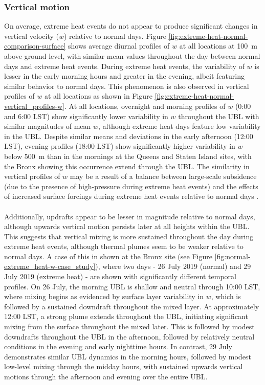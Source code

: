 \documentclass[11pt,a4paper]{article}
\begin{document}
\subsubsection{Vertical motion}
On average, extreme heat events do not appear to produce significant changes in vertical velocity ($w$) relative to normal days. Figure \ref{fig:extreme-heat-normal-comparison-surface} shows average diurnal profiles of $w$ at all locations at \SI{100}{\meter} above ground level, with similar mean values throughout the day between normal days and extreme heat events. During extreme heat events, the variability of $w$ is lesser in the early morning hours and greater in the evening, albeit featuring similar behavior to normal days. This phenomenon is also observed in vertical profiles of $w$ at all locations as shown in Figure \ref{fig:extreme-heat-normal-vertical_profiles-w}. At all locations, overnight and morning profiles of $w$ (0:00 and 6:00 LST) show significantly lower variability in $w$ throughout the UBL with similar magnitudes of mean $w$, although extreme heat days feature low variability in the UBL. Despite similar means and deviations in the early afternoon (12:00 LST), evening profiles (18:00 LST) show significantly higher variability in $w$ below \SI{500}{\meter} than in the mornings at the Queens and Staten Island sites, with the Bronx showing this occurrence extend through the UBL. The similarity in vertical profiles of $w$ may be a result of a balance between large-scale subsidence (due to the presence of high-pressure during extreme heat events) and the effects of increased surface forcings during extreme heat events relative to normal days \citep{dong2018, zhang2009}.
\\ \\
Additionally, updrafts appear to be lesser in magnitude relative to normal days, although upwards vertical motion persists later at all heights within the UBL. This suggests that vertical mixing is more sustained throughout the day during extreme heat events, although thermal plumes seem to be weaker relative to normal days. A case of this in shown at the Bronx site (see Figure \ref{fig:normal-extreme_heat-w-case_study}), where two days - 26 July 2019 (normal) and 29 July 2019 (extreme heat) - are shown with significantly different temporal profiles. On 26 July, the morning UBL is shallow and neutral through 10:00 LST, where mixing begins as evidenced by surface layer variability in $w$, which is followed by a sustained downdraft throughout the mixed layer. At approximately 12:00 LST, a strong plume extends throughout the UBL, initiating significant mixing from the surface throughout the mixed later. This is followed by modest downdrafts throughout the UBL in the afternoon, followed by relatively neutral conditions in the evening and early nighttime hours. In contrast, 29 July demonstrates similar UBL dynamics in the morning hours, followed by modest low-level mixing through the midday hours, with sustained upwards vertical motions through the afternoon and evening over the entire UBL. 
\end{document}
